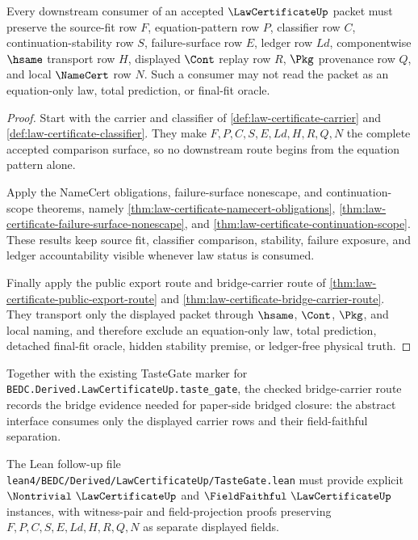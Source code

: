 \begin{theorem}
\label{thm:law-certificate-mature-consumer-route}
Every downstream consumer of an accepted $\LawCertificateUp$ packet must preserve the source-fit row $F$, equation-pattern row $P$, classifier row $C$, continuation-stability row $S$, failure-surface row $E$, ledger row $Ld$, componentwise $\hsame$ transport row $H$, displayed $\Cont$ replay row $R$, $\Pkg$ provenance row $Q$, and local $\NameCert$ row $N$. Such a consumer may not read the packet as an equation-only law, total prediction, or final-fit oracle.
\end{theorem}
\begin{proof}
Start with the carrier and classifier of \autoref{def:law-certificate-carrier} and \autoref{def:law-certificate-classifier}. They make $F,P,C,S,E,Ld,H,R,Q,N$ the complete accepted comparison surface, so no downstream route begins from the equation pattern alone.

Apply the NameCert obligations, failure-surface nonescape, and continuation-scope theorems, namely \autoref{thm:law-certificate-namecert-obligations}, \autoref{thm:law-certificate-failure-surface-nonescape}, and \autoref{thm:law-certificate-continuation-scope}. These results keep source fit, classifier comparison, stability, failure exposure, and ledger accountability visible whenever law status is consumed.

Finally apply the public export route and bridge-carrier route of \autoref{thm:law-certificate-public-export-route} and \autoref{thm:law-certificate-bridge-carrier-route}. They transport only the displayed packet through $\hsame$, $\Cont$, $\Pkg$, and local naming, and therefore exclude an equation-only law, total prediction, detached final-fit oracle, hidden stability premise, or ledger-free physical truth.
\end{proof}

Together with the existing TasteGate marker for \texttt{BEDC.Derived.LawCertificateUp.taste\_gate}, the checked bridge-carrier route records the bridge evidence needed for paper-side bridged closure: the abstract interface consumes only the displayed carrier rows and their field-faithful separation.

The Lean follow-up file \texttt{lean4/BEDC/Derived/LawCertificateUp/TasteGate.lean} must provide explicit $\Nontrivial\ \LawCertificateUp$ and $\FieldFaithful\ \LawCertificateUp$ instances, with witness-pair and field-projection proofs preserving $F,P,C,S,E,Ld,H,R,Q,N$ as separate displayed fields.


